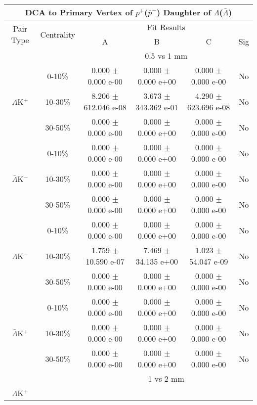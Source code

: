 \documentclass[../AnalysisNoteJBuxton.tex]{subfiles}
\begin{document}
\begin{table}
 \centering
 \begin{tabular}{|c|c|c|c|c|c|}
  \multicolumn{6}{c}{DCA to Primary Vertex of $p^{+}$($\bar{p}^{-}$) Daughter of $\Lambda$($\bar{\Lambda}$)} \\
  \hline
  \multirow{2}{*}{Pair Type} & \multirow{2}{*}{Centrality} & \multicolumn{4}{c|}{Fit Results} \\
  \cline{3-6}
   & & A & B & C & Sig \\  
  \hline
  \multicolumn{2}{|c}{} & \multicolumn{4}{c|}{0.5 vs 1 mm} \\  
  \hline  
  \multirow{3}{*}{$\Lambda$K$^{+}$}
   &  0-10\% & 0.000 $\pm$ 0.000 e-00 & 0.000 $\pm$ 0.000 e+00 & 0.000 $\pm$ 0.000 e-00 & No \\
   & 10-30\% & 8.206 $\pm$ 612.046 e-08 & 3.673 $\pm$ 343.362 e-01 & 4.290 $\pm$ 623.696 e-08 & No \\
   & 30-50\% & 0.000 $\pm$ 0.000 e-00 & 0.000 $\pm$ 0.000 e+00 & 0.000 $\pm$ 0.000 e-00 & No \\
  \hline
  \multirow{3}{*}{$\bar{\Lambda}$K$^{-}$}  
   &  0-10\% & 0.000 $\pm$ 0.000 e-00 & 0.000 $\pm$ 0.000 e+00 & 0.000 $\pm$ 0.000 e-00 & No \\
   & 10-30\% & 0.000 $\pm$ 0.000 e-00 & 0.000 $\pm$ 0.000 e+00 & 0.000 $\pm$ 0.000 e-00 & No \\
   & 30-50\% & 0.000 $\pm$ 0.000 e-00 & 0.000 $\pm$ 0.000 e+00 & 0.000 $\pm$ 0.000 e-00 & No \\
  \hline \hline
  \multirow{3}{*}{$\Lambda$K$^{-}$}
   &  0-10\% & 0.000 $\pm$ 0.000 e-00 & 0.000 $\pm$ 0.000 e+00 & 0.000 $\pm$ 0.000 e-00 & No \\
   & 10-30\% & 1.759 $\pm$ 10.590 e-07 & 7.469 $\pm$ 34.135 e+00 & 1.023 $\pm$ 54.047 e-09 & No \\
   & 30-50\% & 0.000 $\pm$ 0.000 e-00 & 0.000 $\pm$ 0.000 e+00 & 0.000 $\pm$ 0.000 e-00 & No \\
  \hline
  \multirow{3}{*}{$\bar{\Lambda}$K$^{+}$}  
   &  0-10\% & 0.000 $\pm$ 0.000 e-00 & 0.000 $\pm$ 0.000 e+00 & 0.000 $\pm$ 0.000 e-00 & No \\
   & 10-30\% & 0.000 $\pm$ 0.000 e-00 & 0.000 $\pm$ 0.000 e+00 & 0.000 $\pm$ 0.000 e-00 & No \\
   & 30-50\% & 0.000 $\pm$ 0.000 e-00 & 0.000 $\pm$ 0.000 e+00 & 0.000 $\pm$ 0.000 e-00 & No \\  
  \hline
  \multicolumn{2}{|c}{} & \multicolumn{4}{c|}{1 vs 2 mm} \\
  \hline  
  \multirow{3}{*}{$\Lambda$K$^{+}$}   

\end{tabular}
\end{table}
\end{document}
